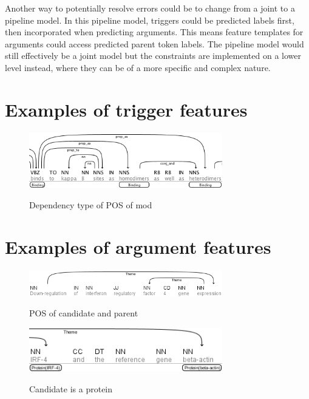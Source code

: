 \documentclass{article} %
\begin{document}
Another way to potentially resolve errors could be to change from a joint to a pipeline model. In this pipeline model, triggers could be predicted labels first, then incorporated when predicting arguments. This means feature templates for arguments could access predicted parent token labels. The pipeline model would still effectively be a joint model but the constraints are implemented on a lower level instead, where they can be of a more specific and complex nature.



\newpage
\begin{appendices}
\section{Examples of trigger features}

\begin{figure}[H]
  \caption{Dependency type of POS of mod}
  \centering
    \includegraphics[width=0.75\textwidth]{images/trig_1.png}
      \label{fig:dep_pos_mod}
\end{figure}

\section{Examples of argument features}

\begin{figure}[H]
  \caption{POS of candidate and parent}
  \centering
    \includegraphics[width=0.75\textwidth]{images/arg_1.png}
      \label{fig:pos_candidate_parent}
\end{figure}

\begin{figure}[H]
  \caption{Candidate is a protein}
  \centering
    \includegraphics[width=0.75\textwidth]{images/arg_4.png}
      \label{fig:candidate_is_protein}
\end{figure}


\end{appendices}
\end{document}
